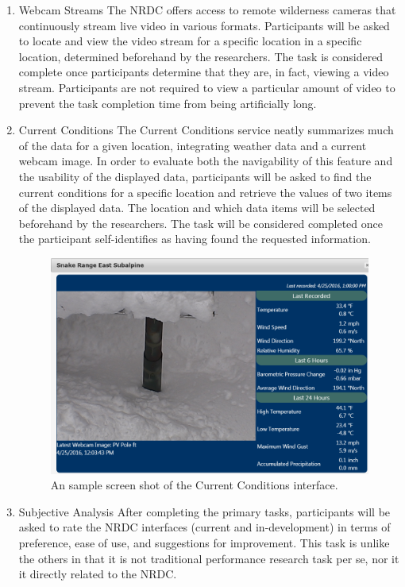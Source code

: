 \documentclass{article}
\begin{document}
\begin{enumerate}
\item Webcam Streams
The NRDC offers access to remote wilderness cameras that continuously stream live video in various formats. Participants will be asked to locate and view the video stream for a specific location in a specific location, determined beforehand by the researchers. The task is considered complete once participants determine that they are, in fact, viewing a video stream. Participants are not required to view a particular amount of video to prevent the task completion time from being artificially long.


\item Current Conditions
The Current Conditions service neatly summarizes much of the data for a given location, integrating weather data and a current webcam image. In order to evaluate both the navigability of this feature and the usability of the displayed data, participants will be asked to find the current conditions for a specific location and retrieve the values of two items of the displayed data. The location and which data items will be selected beforehand by the researchers. The task will be considered completed once the participant self-identifies as having found the requested information.

\begin{figure}[h!]
  \centering
  \includegraphics[width=.6\linewidth]{current-conditions-example}
  \caption{An sample screen shot of the Current Conditions interface.}
  \label{fig:current-conditions}
\end{figure}

\item Subjective Analysis
After completing the primary tasks, participants will be asked to rate the NRDC interfaces (current and in-development) in terms of preference, ease of use, and suggestions for improvement. This task is unlike the others in that it is not traditional performance research task per se, nor it it directly related to the NRDC.

%
\end{enumerate}
\end{document}

